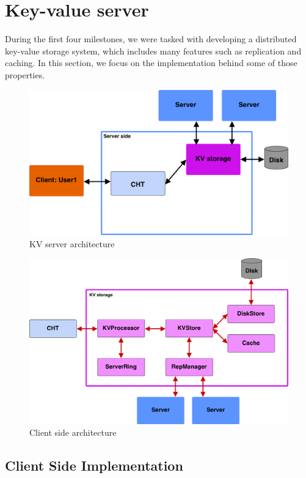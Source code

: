 \section{Key-value server}
During the first four milestones, we were tasked with developing a distributed key-value storage system, which includes many features such as replication and caching. In this section, we focus on the implementation behind some of those properties.

\begin{figure}[h]
	\centering
	\includegraphics[width=\linewidth]{figures/kvserver/ms4_structure.png}
	\caption{KV server architecture}
\end{figure}




\begin{figure}[h]
	\centering
	\includegraphics[width=\linewidth]{figures/kvserver/kvs_arch.png}
	\caption{Client side architecture}
\end{figure}


\subsection{Client Side Implementation}
\label{sec:Implementation_clintside}

